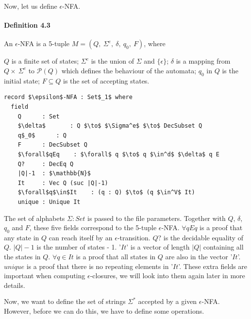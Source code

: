 \documentclass[twoside,openright,final]{bhamthesis}
\renewcommand{\item}{\itemindent0.5cm\itemold}
\begin{document}
\par Now, let us define \(\epsilon\)-NFA. 

\paragraph{Definition 4.3} An \(\epsilon\)-NFA is a 5-tuple \(M = (Q
,\ \Sigma^e,\ \delta,\ q_0,\ F)\), where
\begin{enumerate}[nolistsep]
  \item \(Q\) is a finite set of states;
  \item \(\Sigma^e\) is the union of \(\Sigma\) and \(\{\epsilon\}\);
  \item \(\delta\) is a mapping from \(Q \times\ \Sigma^e\) to
    \(\mathcal P \left({Q}\right)\) which defines the behaviour of the automata;
  \item \(q_0\) in \(Q\) is the initial state;
  \item \(F \subseteq Q\) is the set of accepting states. 
\end{enumerate}
\begin{lstlisting}[caption=\(\epsilon\)-NFA,mathescape=true]
record $\epsilon$-NFA : Set$_1$ where
  field
    Q      : Set
    $\delta$       : Q $\to$ $\Sigma^e$ $\to$ DecSubset Q
    q$_0$      : Q
    F      : DecSubset Q
    $\forall$qEq    : $\forall$ q $\to$ q $\in^d$ $\delta$ q E
    Q?     : DecEq Q
    |Q|-1  : $\mathbb{N}$
    It     : Vec Q (suc |Q|-1)
    $\forall$q$\in$It    : (q : Q) $\to$ (q $\in^V$ It)
    unique : Unique It
\end{lstlisting}
\vspace{1pc}
\par The set of alphabets \(\Sigma : Set\) is passed to the file
parameters. Together with \(Q\), \(\delta\),
\(q_0\) and \(F\), these five fields correspond to the 5-tuple
\(\epsilon\)-NFA. \(\forall qEq\) is a proof that any state in \(Q\)
can reach itself by an \(\epsilon\)-transition. \(Q?\) is
the decidable equality of \(Q\). \(|Q|-1\) is the number of states -
1. '\(It\)' is a vector of length \(|Q|\) containing all the
states in \(Q\). \(\forall q\in It\) is a
proof that all states in \(Q\) are also in the vector
'\(It\)'. \(unique\) is a proof that there is no repeating elements in
'\(It\)'. These extra fields are important when computing
\(\epsilon\)-closures, we will look into them again later in more
details.  

\par Now, we want to define the set of strings \(\Sigma^*\) accepted by a given
\(\epsilon\)-NFA. However, before we can do this, we have to define
some operations.
\end{document}
